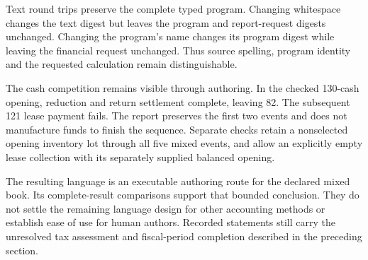 Text round trips preserve the complete typed program. Changing whitespace
changes the text digest but leaves the program and report-request digests
unchanged. Changing the program's name changes its program digest while
leaving the financial request unchanged. Thus source spelling, program
identity and the requested calculation remain distinguishable.

The cash competition remains visible through authoring. In the checked
130-cash opening, reduction and return settlement complete, leaving 82.
The subsequent 121 lease payment fails. The report preserves the first two
events and does not manufacture funds to finish the sequence. Separate checks
retain a nonselected opening inventory lot through all five mixed events,
and allow an explicitly empty lease collection with its separately supplied
balanced opening.

The resulting language is an executable authoring route for the declared
mixed book. Its complete-result comparisons support that bounded conclusion.
They do not settle the remaining language design for other accounting methods
or establish ease of use for human authors. Recorded statements still carry
the unresolved tax assessment and fiscal-period completion described in the
preceding section.
